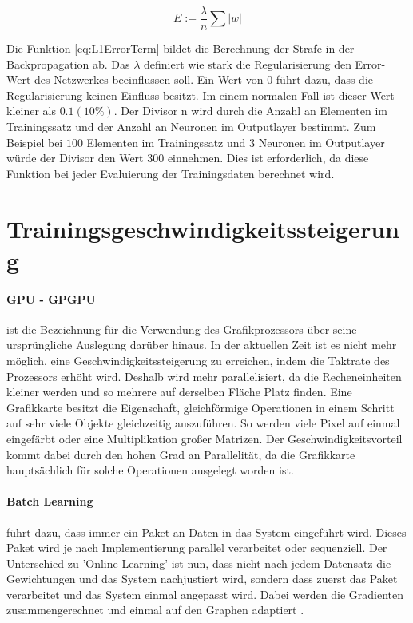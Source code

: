 \begin{equation}
	E := \frac{\lambda}{n} \sum |w|
	\label{eq:L1ErrorTerm}
\end{equation}

Die Funktion \ref{eq:L1ErrorTerm} bildet die Berechnung der Strafe in der Backpropagation ab.
Das $\lambda$ definiert wie stark die Regularisierung den Error-Wert des Netzwerkes beeinflussen soll.
Ein Wert von $0$ führt dazu, dass die Regularisierung keinen Einfluss besitzt. 
Im einem normalen Fall ist dieser Wert kleiner als $0.1 (10\%)$.
Der Divisor n wird durch die Anzahl an Elementen im Trainingssatz und der Anzahl an Neuronen im Outputlayer bestimmt.
Zum Beispiel bei $100$ Elementen im Trainingssatz und $3$ Neuronen im Outputlayer würde der Divisor den Wert $300$ einnehmen.
Dies ist erforderlich, da diese Funktion bei jeder Evaluierung der Trainingsdaten berechnet wird.

\section{Trainingsgeschwindigkeitssteigerung}

\paragraph{GPU - GPGPU} ist die Bezeichnung für die Verwendung des Grafikprozessors über seine ursprüngliche Auslegung darüber hinaus.
In der aktuellen Zeit ist es nicht mehr möglich, eine Geschwindigkeitssteigerung zu erreichen, indem die Taktrate des Prozessors erhöht wird. 
Deshalb wird mehr parallelisiert, da die Recheneinheiten kleiner werden und so mehrere auf derselben Fläche Platz finden. 
Eine Grafikkarte besitzt die Eigenschaft, gleichförmige Operationen in einem Schritt auf sehr viele Objekte gleichzeitig auszuführen. 
So werden viele Pixel auf einmal eingefärbt oder eine Multiplikation großer Matrizen. 
Der Geschwindigkeitsvorteil kommt dabei durch den hohen Grad an Parallelität, da die Grafikkarte hauptsächlich für solche Operationen ausgelegt worden ist.

\paragraph{Batch Learning} %
führt dazu, dass immer ein Paket an Daten in das System eingeführt wird. 
Dieses Paket wird je nach Implementierung parallel verarbeitet oder sequenziell. 
Der Unterschied zu 'Online Learning' ist nun, dass nicht nach jedem Datensatz die Gewichtungen und das System nachjustiert wird, sondern dass zuerst das Paket verarbeitet und das System einmal angepasst wird. 
Dabei werden die Gradienten zusammengerechnet und einmal auf den Graphen adaptiert \cite{AI3}.






